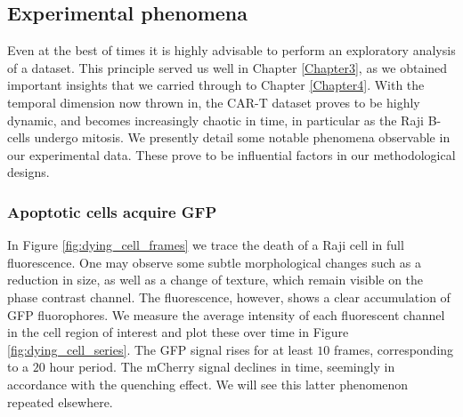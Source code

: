 \subsection{Experimental phenomena}
\label{subsec:phenomena}

Even at the best of times it is highly advisable to perform an exploratory analysis of a dataset. This principle served us well in Chapter \ref{Chapter3}, as we obtained important insights that we carried through to Chapter \ref{Chapter4}. With the temporal dimension now thrown in, the CAR-T dataset proves to be highly dynamic, and becomes increasingly chaotic in time, in particular as the Raji B-cells undergo mitosis. We presently detail some notable phenomena observable in our experimental data. These prove to be influential factors in our methodological designs.

\subsubsection{Apoptotic cells acquire GFP}

In Figure \ref{fig:dying_cell_frames} we trace the death of a Raji cell in full fluorescence. One may observe some subtle morphological changes such as a reduction in size, as well as a change of texture, which remain visible on the phase contrast channel. The fluorescence, however, shows a clear accumulation of GFP fluorophores. We measure the average intensity of each fluorescent channel in the cell region of interest and plot these over time in Figure \ref{fig:dying_cell_series}. The GFP signal rises for at least $10$ frames, corresponding to a $20$ hour period. The mCherry signal declines in time, seemingly in accordance with the quenching effect. We will see this latter phenomenon repeated elsewhere.

%

